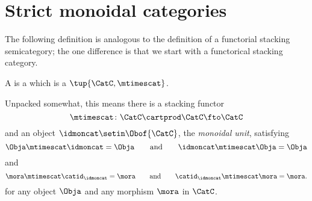
\section{Strict monoidal categories}
\label{sec:strict-monoidal-categories}

The following definition is analogous to the definition of a functorial stacking semicategory; the one difference is that we start with a functorical stacking category.

\begin{ctdefinition}
    \label{def:strict-monoidal-category}
    A  is a  which is a  $\tup{\CatC, \mtimescat}$.

    Unpacked somewhat, this means there is a stacking functor
    \begin{equation}
        \mtimescat \colon \CatC \cartprod \CatC \fto \CatC
    \end{equation}
    and an object $\idmoncat \setin \Obof{\CatC}$, the \emph{monoidal unit}, satisfying
    \begin{equation}
        \Obja \mtimescat \idmoncat = \Obja \qquad \text{and} \qquad \idmoncat \mtimescat \Obja = \Obja
    \end{equation}
    and
    \begin{equation}
        \mora \mtimescat \catid_\idmoncat = \mora \qquad \text{and} \qquad \catid_\idmoncat \mtimescat \mora = \mora.
    \end{equation}
    for any object $\Obja$ and any morphism $\mora$ in $\CatC$.
\end{ctdefinition}



